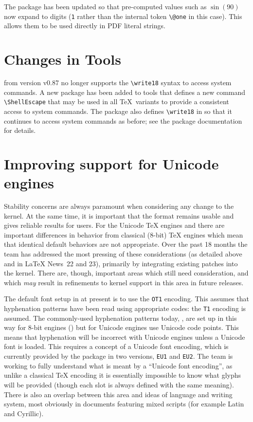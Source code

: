 \documentclass{ltnews}
\begin{document}
The  package has been updated so that pre-computed values
such as $\sin(90)$ now expand to digits (\texttt{1} rather than the
internal token \verb|\@one| in this case). This allows them to be used
directly in PDF literal strings.

\section{Changes in Tools}

 from version v0.87 no longer supports the
\verb|\write18| syntax to access system commands. A new package
 has been added to \textsf{tools} that defines a new
command \verb|\ShellEscape| that may be used in all \TeX\ variants to
provide a consistent access to system commands. The package also
defines \verb|\write18| in   so that it continues to access
system commands as before; see the package documentation for details.

\section{Improving support for Unicode engines}

Stability concerns are always paramount when considering any change to
the \LaTeXe{} kernel. At the same time, it is important that the format
remains usable and gives reliable results for users. For the Unicode
\TeX{} engines  and  there are important
differences in behavior from classical ($8$-bit) \TeX{} engines which
mean that identical default behaviors are not appropriate. Over the
past 18 months the team has addressed the most pressing of these
considerations (as detailed above and in \LaTeX{} News~22 and 23),
primarily by integrating existing patches into the kernel. There are,
though, important areas which still need consideration, and which
\emph{may} result in refinements to kernel support in this area in
future releases.

The default font setup in \LaTeXe{} at present is to use the \texttt{OT1}
encoding. This assumes that hyphenation patterns have been read using
appropriate codes: the \texttt{T1} encoding is assumed. The commonly-used
hyphenation patterns today, , are set up in this
way for $8$-bit engines () but for Unicode engines use
Unicode code points. This means that hyphenation will be incorrect
with Unicode engines unless a Unicode font is loaded. This requires
a concept of a Unicode font encoding, which is currently provided by
the  package in two versions, \texttt{EU1} and
\texttt{EU2}. The team is working to fully understand what is meant
by a ``Unicode font encoding'', as unlike a classical \TeX{} encoding
it is essentially impossible to know what glyphs will be provided
(though each slot is always defined with the same meaning).  There
is also an overlap between this area and ideas of language and writing
system, most obviously in documents featuring mixed scripts (for example
Latin and Cyrillic).
\end{document}

